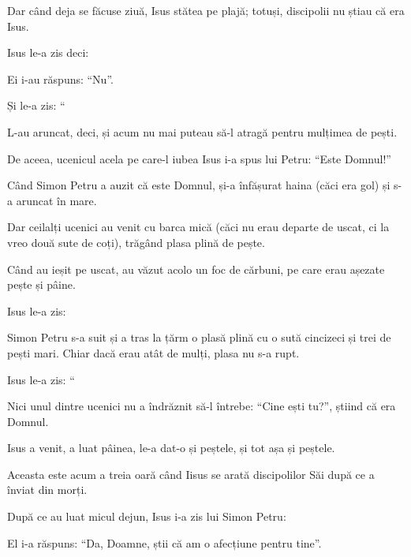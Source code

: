 {Dar când deja se făcuse ziuă, Isus stătea pe plajă; totuși, discipolii nu știau că era Isus.

Isus le-a zis deci:
{}

\par }{\PP Ei i-au răspuns: “Nu”.


\par }{\PP {}Și le-a zis: “{}

\par }{\PP L-au aruncat, deci, și acum nu mai puteau să-l atragă pentru mulțimea de pești.

De aceea, ucenicul acela pe care-l iubea Isus i-a spus lui Petru: “Este Domnul!”

\par }{\PP Când Simon Petru a auzit că este Domnul, și-a înfășurat haina (căci era gol) și s-a aruncat în mare.

Dar ceilalți ucenici au venit cu barca mică (căci nu erau departe de uscat, ci la vreo două sute de coți), trăgând plasa plină de pește.

Când au ieșit pe uscat, au văzut acolo un foc de cărbuni, pe care erau așezate pește și pâine.

Isus le-a zis:
{}


\par }{\PP {}Simon Petru s-a suit și a tras la țărm o plasă plină cu o sută cincizeci și trei de pești mari. Chiar dacă erau atât de mulți, plasa nu s-a rupt.


\par }{\PP {}Isus le-a zis: “{}

\par }{\PP Nici unul dintre ucenici nu a îndrăznit să-l întrebe: “Cine ești tu?”, știind că era Domnul.


\par }{\PP {}Isus a venit, a luat pâinea, le-a dat-o și peștele, și tot așa și peștele.

Aceasta este acum a treia oară când Iisus se arată discipolilor Săi după ce a înviat din morți.

După ce au luat micul dejun, Isus i-a zis lui Simon Petru:
{}

\par }{\PP El i-a răspuns: “Da, Doamne, știi că am o afecțiune pentru tine”.

}
